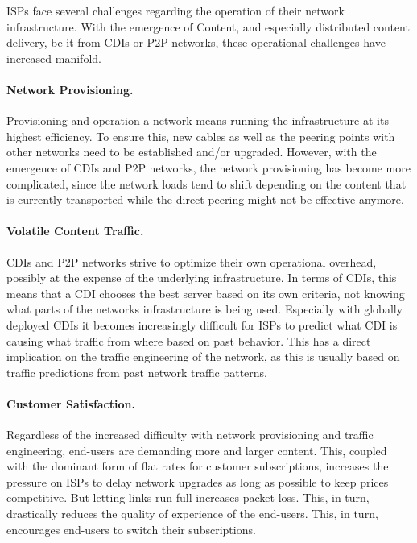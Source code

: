 ISPs face several challenges regarding the operation of their network
infrastructure. With the emergence of Content, and especially distributed
content delivery, be it from CDIs or P2P networks, these operational challenges
have increased manifold.

\paragraph{Network Provisioning.} Provisioning and operation a network means
running the infrastructure at its highest efficiency. To ensure this, new
cables as well as the peering points with other networks need to be established
and/or upgraded. However, with the emergence of CDIs and P2P networks, the
network provisioning has become more complicated, since the network loads tend
to shift depending on the content that is currently transported while the
direct peering might not be effective anymore.

\paragraph{Volatile Content Traffic.} CDIs and P2P networks strive to optimize
their own operational overhead, possibly at the expense of the underlying
infrastructure. In terms of CDIs, this means that a CDI chooses the best server
based on its own criteria, not knowing what parts of the networks
infrastructure is being used. Especially with globally deployed CDIs it becomes
increasingly difficult for ISPs to predict what CDI is causing what traffic
from where based on past behavior. This has a direct implication on the traffic
engineering of the network, as this is usually based on traffic predictions
from past network traffic patterns.

\paragraph{Customer Satisfaction.} Regardless of the increased difficulty with
network provisioning and traffic engineering, end-users are demanding more and
larger content. This, coupled with the dominant form of flat rates for customer
subscriptions, increases the pressure on ISPs to delay network upgrades as long
as possible to keep prices competitive. But letting links run full increases
packet loss. This, in turn, drastically reduces the quality of experience of
the end-users. This, in turn, encourages end-users to switch their
subscriptions.


